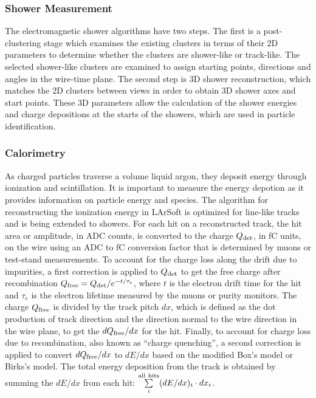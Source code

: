 
\subsubsection{Shower Measurement}


The electromagnetic shower algorithms have two
steps. The first is a post-clustering stage which examines the
existing clusters in terms of their 2D parameters to determine whether
the clusters are shower-like or track-like. 
The selected shower-like clusters are examined to assign starting points,
directions and angles in the wire-time plane. The second step is 
3D shower reconstruction, which
matches the 2D clusters between views in order to obtain 3D shower axes and start points.
These 3D parameters allow the calculation of the shower energies and charge
depositions at the starts of the showers, which are used in particle
identification. 


\subsubsection{Calorimetry}


As charged particles traverse a volume liquid argon, they deposit
energy through ionization and scintillation. It is important to
measure the energy depotion as it provides information on particle
energy and species. The algorithm for reconstructing the ionization
energy in LArSoft is optimized for line-like tracks and is being
extended to showers. 
For each hit on a reconstructed track, the hit area or amplitude, in ADC counts, is
converted to the charge $Q_{\rm{det}}$, in fC units, on the wire using an
ADC to fC conversion factor that is determined by muons or test-stand
measurements. To account for the charge loss along the drift due to
impurities, a first correction is applied to $Q_{\rm{det}}$ to get the free
charge after recombination $Q_{\rm{free}} = Q_{\rm{det}}/e^{-t/\tau_{e}}$, where
$t$ is the electron drift time for the hit and $\tau_{e}$ is the
electron lifetime measured by the muons or purity monitors. The charge
$Q_{\rm{free}}$ is divided by the track pitch $dx$, which is defined as the
dot production of track direction and the direction normal to the wire
direction in the wire plane, to get the $dQ_{\rm{free}}/dx$ for the
hit. Finally, to account for charge loss due to recombination, also
known as ``charge quenching'', a second correction is applied to
convert $dQ_{\rm{free}}/dx$ to $dE/dx$ based on the modified Box's model
\cite{box} or Birks's model\cite{birks}. The total energy
deposition from the track is obtained by summing the $dE/dx$ from each
hit: $\sum\limits_{i}^{\rm{all\ hits}}(dE/dx)_{i}\cdot dx_{i}$.

